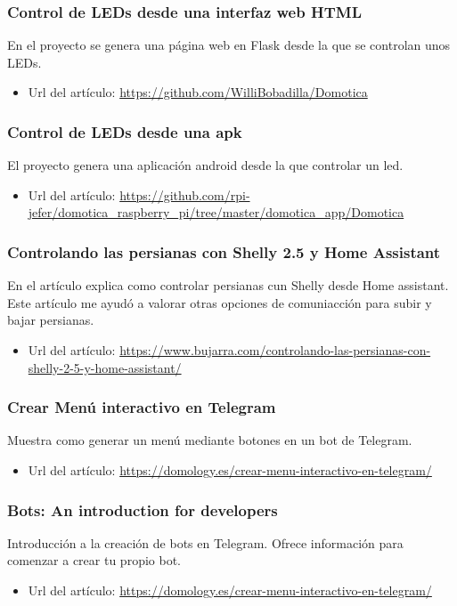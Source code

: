 \subsubsection{Control de LEDs desde una interfaz web HTML}
En el proyecto se genera una página web en Flask desde la que se controlan unos LEDs.
\begin{itemize}
    \item Url del artículo: \url{https://github.com/WilliBobadilla/Domotica}
\end{itemize}

\subsubsection{Control de LEDs desde una apk}
El proyecto genera una aplicación android desde la que controlar un led.
\begin{itemize}
    \item Url del artículo: \url{https://github.com/rpi-jefer/domotica_raspberry_pi/tree/master/domotica_app/Domotica}
\end{itemize}

\subsubsection{Controlando las persianas con Shelly 2.5 y Home Assistant}
En el artículo explica como controlar persianas cun Shelly desde Home assistant. Este artículo me ayudó a valorar otras opciones de comuniacción para subir y bajar persianas.
\begin{itemize}
    \item Url del artículo: \url{https://www.bujarra.com/controlando-las-persianas-con-shelly-2-5-y-home-assistant/}
\end{itemize}

\subsubsection{Crear Menú interactivo en Telegram}
Muestra como generar un menú mediante botones en un bot de Telegram.
\begin{itemize}
    \item Url del artículo: \url{https://domology.es/crear-menu-interactivo-en-telegram/}
\end{itemize}

\subsubsection{Bots: An introduction for developers}
Introducción a la creación de bots en Telegram. Ofrece información para comenzar a crear tu propio bot.
\begin{itemize}
    \item Url del artículo: \url{https://domology.es/crear-menu-interactivo-en-telegram/}
\end{itemize}

